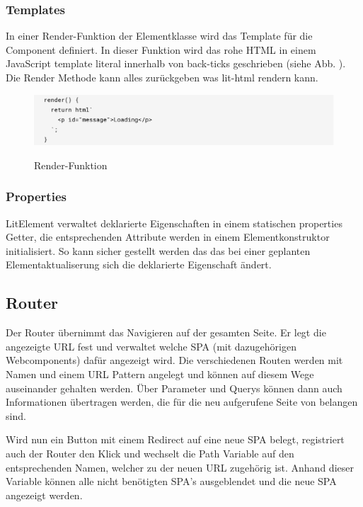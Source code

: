 \documentclass[12pt,					%
							 oneside,			%
							 a4paper,			%
							 halfparskip,		%
							 liststotoc,			%
							 bibtotoc,			%
							 fleqn,				%
							 pointlessnumbers]	%
							 {scrreprt}
\begin{document}
					\subsubsection{Templates}
					In einer Render-Funktion der Elementklasse wird das Template für die Component definiert. In dieser Funktion wird das rohe HTML in einem JavaScript template literal innerhalb von back-ticks geschrieben (siehe Abb. ). Die Render Methode kann alles zurückgeben was lit-html rendern kann. \cite{litelem}
					\begin{figure}[h]
						\centering
						\includegraphics[width=1\textwidth]{pictures/render-function}
						\caption{Render-Funktion}\cite{litelem}
						\label{Render-Funktion}
					\end{figure}
				
					\subsubsection{Properties}
					LitElement verwaltet deklarierte Eigenschaften in einem statischen properties Getter, die entsprechenden Attribute werden in einem Elementkonstruktor initialisiert. So kann sicher gestellt werden das das bei einer geplanten Elementaktualiserung sich die deklarierte Eigenschaft ändert.  \cite{litelem}

					\subsection{Router}
Der Router übernimmt das Navigieren auf der gesamten Seite.
Er legt die angezeigte URL fest und verwaltet welche SPA
(mit dazugehörigen Webcomponents) dafür angezeigt wird.
Die verschiedenen Routen werden mit Namen und einem URL Pattern angelegt
und können auf diesem Wege auseinander gehalten werden.
Über Parameter und Querys können dann auch Informationen übertragen werden,
die für die neu aufgerufene Seite von belangen sind.

Wird nun ein Button mit einem Redirect auf eine neue SPA belegt,
registriert auch der Router den Klick und wechselt die Path Variable
auf den entsprechenden Namen, welcher zu der neuen URL zugehörig ist.
Anhand dieser Variable können alle nicht benötigten SPA's ausgeblendet
und die neue SPA angezeigt werden.
\end{document}
